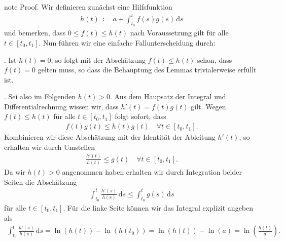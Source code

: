\documentclass[letterpaper,10pt,german]{jupyterBook}
\begin{document}
\begin{sphinxadmonition}{note}
\sphinxAtStartPar
Proof. Wir definieren zunächst eine Hilfsfunktion
\begin{equation*}
\begin{split}h(t) \ \coloneqq \ a + \int_{t_0}^t f(s)g(s)\, \mathrm{d}s\end{split}
\end{equation*}
\sphinxAtStartPar
und bemerken, dass \(0 \leq f(t) \leq h(t)\) nach Voraussetzung gilt für alle \(t \in [t_0, t_1]\).
Nun führen wir eine einfache Fallunterscheidung durch:

. Ist \(h(t)=0\), so folgt mit der Abschätzung \(f(t) \leq h(t)\) schon, dass \(f(t) = 0\) gelten muss, so dass die Behauptung des Lemmas trivialerweise erfüllt ist.

. Sei also im Folgenden \(h(t) > 0\).
Aus dem Haupsatz der Integral\sphinxhyphen{} und Differentialrechnung wissen wir, dass \(h'(t) = f(t)g(t)\) gilt.
Wegen \(f(t) \leq h(t)\) für alle \(t \in [t_0, t_1]\) folgt sofort, dass
\begin{equation*}
\begin{split}f(t)g(t) \leq h(t)g(t) \quad \forall t \in [t_0,t_1].\end{split}
\end{equation*}
\sphinxAtStartPar
Kombinieren wir diese Abschätzung mit der Identität der Ableitung \(h'(t)\), so erhalten wir durch Umstellen
\begin{equation*}
\begin{split}\frac{h'(t)}{h(t)} \leq g(t) \quad \forall t \in [t_0, t_1].\end{split}
\end{equation*}
\sphinxAtStartPar
Da wir \(h(t) > 0\) angenommen haben erhalten wir durch Integration beider Seiten die Abschätzung
\begin{equation*}
\begin{split}\int_{t_0}^t \frac{h'(s)}{h(s)} \, \mathrm{d}s \leq \int_{t_0}^t g(s) \, \mathrm{d}s \end{split}
\end{equation*}
\sphinxAtStartPar
für alle \(t \in [t_0, t_1]\).
Für die linke Seite können wir das Integral explizit angeben als
\begin{equation*}
\begin{split}\int_{t_0}^t \frac{h'(s)}{h(s)} \, \mathrm{d}s = \ln(h(t)) - \ln(h(t_0)) = \ln(h(t)) - \ln(a) = \ln\left(\frac{h(t)}{a}\right).\end{split}

\end{equation*}
\end{sphinxadmonition}
\end{document}
